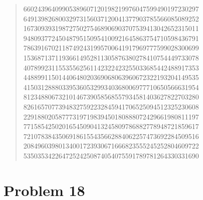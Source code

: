 \documentclass[oneside,12pt]{book}   	%
\theoremstyle{definition}
\begin{document}
\begin{spacing}{1.618}
\begin{quote}
66024396409905389607120198219976047599490197230297 \\
64913982680032973156037120041377903785566085089252 \\
16730939319872750275468906903707539413042652315011 \\
94809377245048795150954100921645863754710598436791 \\
78639167021187492431995700641917969777599028300699 \\
15368713711936614952811305876380278410754449733078 \\
40789923115535562561142322423255033685442488917353 \\
44889911501440648020369068063960672322193204149535 \\
41503128880339536053299340368006977710650566631954 \\
81234880673210146739058568557934581403627822703280 \\
82616570773948327592232845941706525094512325230608 \\
22918802058777319719839450180888072429661980811197 \\
77158542502016545090413245809786882778948721859617 \\
72107838435069186155435662884062257473692284509516 \\
20849603980134001723930671666823555245252804609722 \\
53503534226472524250874054075591789781264330331690 
		\end{quote}
	\chapter{Problem 18}\label{A:P:18}
	

\end{spacing}
\end{document}
